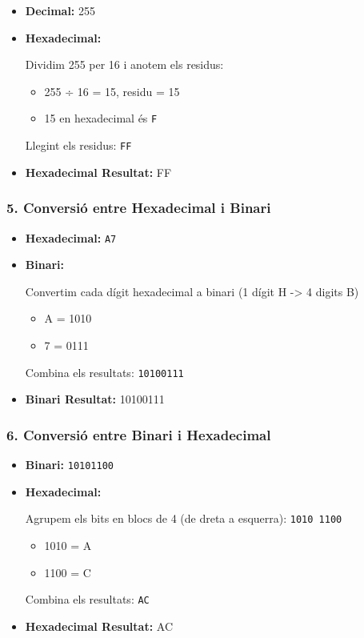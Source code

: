 \documentclass[
  12 pt,
  a4paper,
]{article}
\providecommand{\tightlist}{%
  \setlength{\itemsep}{0pt}\setlength{\parskip}{0pt}}
\begin{document}
\begin{itemize}
\item
  \textbf{Decimal:} 255
\item
  \textbf{Hexadecimal:}

  Dividim 255 per 16 i anotem els residus:

  \begin{itemize}
  \tightlist
  \item
    255 ÷ 16 = 15, residu = 15
  \item
    15 en hexadecimal és \texttt{F}
  \end{itemize}

  Llegint els residus: \texttt{FF}
\item
  \textbf{Hexadecimal Resultat:} FF
\end{itemize}

\subsubsection{5. Conversió entre Hexadecimal i
Binari}\label{conversiuxf3-entre-hexadecimal-i-binari}

\begin{itemize}
\item
  \textbf{Hexadecimal:} \texttt{A7}
\item
  \textbf{Binari:}

  Convertim cada dígit hexadecimal a binari (1 dígit H -\textgreater{} 4
  digits B)

  \begin{itemize}
  \tightlist
  \item
    A = 1010
  \item
    7 = 0111
  \end{itemize}

  Combina els resultats: \texttt{10100111}
\item
  \textbf{Binari Resultat:} 10100111
\end{itemize}

\subsubsection{6. Conversió entre Binari i
Hexadecimal}\label{conversiuxf3-entre-binari-i-hexadecimal}

\begin{itemize}
\item
  \textbf{Binari:} \texttt{10101100}
\item
  \textbf{Hexadecimal:}

  Agrupem els bits en blocs de 4 (de dreta a esquerra):
  \texttt{1010\ 1100}

  \begin{itemize}
  \tightlist
  \item
    1010 = A
  \item
    1100 = C
  \end{itemize}

  Combina els resultats: \texttt{AC}
\item
  \textbf{Hexadecimal Resultat:} AC
\end{itemize}
\end{document}
